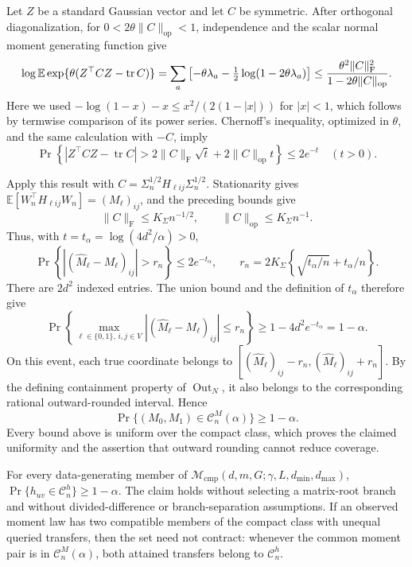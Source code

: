 Let \(Z\) be a standard Gaussian vector and let \(C\) be symmetric. After
orthogonal diagonalization, for
\(0<2\theta\lVert C\rVert_{\mathrm{op}}<1\), independence and the scalar
normal moment generating function give
\[
 \log\mathbb E\exp\{\theta(Z^\top CZ-\operatorname{tr}C)\}
 =\sum_a\left[-\theta\lambda_a-\tfrac12\log(1-2\theta\lambda_a)\right]
 \le {\theta^2\lVert C\rVert_{\mathrm F}^2
       \over1-2\theta\lVert C\rVert_{\mathrm{op}}}.
\]
Here we used
\(-\log(1-x)-x\le x^2/(2(1-|x|))\) for \(|x|<1\), which follows by
termwise comparison of its power series. Chernoff's inequality, optimized
in \(\theta\), and the same calculation with \(-C\), imply
\[
 \Pr\left\{|Z^\top CZ-\operatorname{tr}C|>
 2\lVert C\rVert_{\mathrm F}\sqrt t+
 2\lVert C\rVert_{\mathrm{op}}t\right\}\le2e^{-t}
 \quad(t>0).
\]

Apply this result with
\(C=\Sigma_n^{1/2}H_{\ell ij}\Sigma_n^{1/2}\). Stationarity gives
\(\mathbb E[W_n^\top H_{\ell ij}W_n]=(M_\ell)_{ij}\), and the preceding
bounds give
\[
 \lVert C\rVert_{\mathrm F}\le K_\Sigma n^{-1/2},
 \qquad
 \lVert C\rVert_{\mathrm{op}}\le K_\Sigma n^{-1}.
\]
Thus, with \(t=t_\alpha=\log(4d^2/\alpha)>0\),
\[
 \Pr\left\{|(\widehat M_\ell-M_\ell)_{ij}|>r_n\right\}
 \le2e^{-t_\alpha},
 \qquad
 r_n=2K_\Sigma\left\{\sqrt{t_\alpha/n}+t_\alpha/n\right\}.
\]
There are \(2d^2\) indexed entries. The union bound and the definition of
\(t_\alpha\) therefore give
\[
 \Pr\left\{\max_{\ell\in\{0,1\},\,i,j\in V}
 |(\widehat M_\ell-M_\ell)_{ij}|\le r_n\right\}
 \ge1-4d^2e^{-t_\alpha}=1-\alpha.
\]
On this event, each true coordinate belongs to
\([ (\widehat M_\ell)_{ij}-r_n,
    (\widehat M_\ell)_{ij}+r_n ]\). By the defining containment property of
\(\operatorname{Out}_N\), it also belongs to the corresponding rational
outward-rounded interval. Hence
\[
 \Pr\{(M_0,M_1)\in\mathcal C_n^M(\alpha)\}\ge1-\alpha.
\]
Every bound above is uniform over the compact class, which proves the
claimed uniformity and the assertion that outward rounding cannot reduce
coverage.

For every data-generating member of
\(\mathcal M_{\mathrm{cmp}}(d,m,G;\gamma,L,d_{\min},d_{\max})\),
\(\Pr\{h_{uv}\in\mathcal C_n^h\}\ge1-\alpha\). The claim holds without
selecting a matrix-root branch and without divided-difference or
branch-separation assumptions. If an observed moment law has two compatible
members of the compact class with unequal queried transfers, then the set
need not contract: whenever the common moment pair is in
\(\mathcal C_n^M(\alpha)\), both attained transfers belong to
\(\mathcal C_n^h\).

